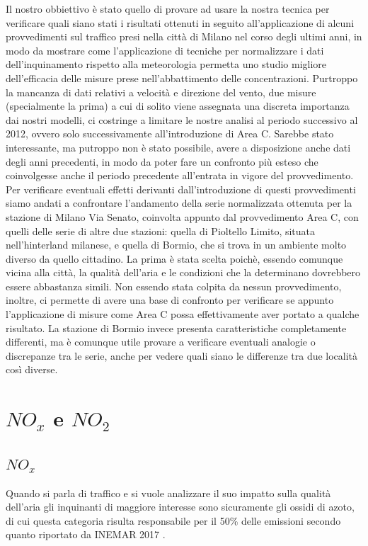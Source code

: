 \documentclass[a4paper]{report}
\begin{document}
Il nostro obbiettivo è stato quello di provare ad usare la nostra tecnica per verificare quali siano stati i risultati ottenuti in seguito all'applicazione di alcuni provvedimenti sul traffico presi nella città di Milano nel corso degli ultimi anni, in modo da mostrare come l'applicazione di tecniche per normalizzare i dati dell'inquinamento rispetto alla meteorologia permetta uno studio migliore dell'efficacia delle misure prese nell'abbattimento delle concentrazioni. Purtroppo la mancanza di dati relativi a velocità e direzione del vento, due misure (specialmente la prima) a cui di solito viene assegnata una discreta importanza dai nostri modelli, ci costringe a limitare le nostre analisi al periodo successivo al 2012, ovvero solo successivamente all'introduzione di Area C. Sarebbe stato interessante, ma putroppo non è stato possibile, avere a disposizione anche dati degli anni precedenti, in modo da poter fare un confronto più esteso che coinvolgesse anche il periodo precedente all'entrata in vigore del provvedimento.
Per verificare eventuali effetti derivanti dall'introduzione di questi provvedimenti siamo andati a confrontare l'andamento della serie normalizzata ottenuta per la stazione di Milano Via Senato, coinvolta appunto dal provvedimento Area C, con quelli delle serie di altre due stazioni: quella di Pioltello Limito, situata nell'hinterland milanese, e quella di Bormio, che si trova in un ambiente molto diverso da quello cittadino. La prima è stata scelta poichè, essendo comunque vicina alla città, la qualità dell'aria e le condizioni che la determinano dovrebbero essere abbastanza simili. Non essendo stata colpita da nessun provvedimento, inoltre, ci permette di avere una base di confronto per verificare se appunto l'applicazione di misure come Area C possa effettivamente aver portato a qualche risultato. La stazione di Bormio invece presenta caratteristiche completamente differenti, ma è comunque utile provare a verificare eventuali analogie o discrepanze tra le serie, anche per vedere quali siano le differenze tra due località così diverse.

\section{$NO_x$ e $NO_2$}
\subsection{$NO_x$}
Quando si parla di traffico e si vuole analizzare il suo impatto sulla qualità dell'aria gli inquinanti di maggiore interesse sono sicuramente gli ossidi di azoto, di cui questa categoria risulta responsabile per il 50\% delle emissioni secondo quanto riportato da INEMAR 2017 \cite{inemar2017}.
\end{document}
